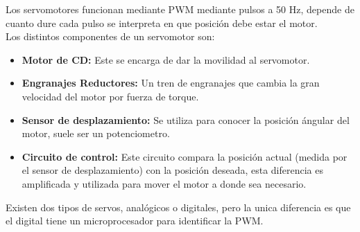 \documentclass[11pt]{scrartcl}
\begin{document}
Los servomotores funcionan mediante PWM mediante pulsos a 50 Hz, depende de cuanto dure cada pulso se interpreta en que posición debe estar el motor.  \\


Los distintos componentes de un servomotor son:

\begin{itemize}
    \item \textbf{Motor de CD: } Este se encarga de dar la movilidad al servomotor. 
    \item \textbf{Engranajes Reductores: } Un tren de engranajes que cambia la gran velocidad del motor por fuerza de torque. 
    \item \textbf{Sensor de desplazamiento: } Se utiliza para conocer la posición ángular del motor, suele ser un potenciometro.
    \item \textbf{Circuito de control: } Este circuito compara la posición actual (medida por el sensor de desplazamiento) con la posición deseada, esta diferencia es amplificada y utilizada para mover el motor a donde sea necesario.
\end{itemize}


Existen dos tipos de servos, analógicos o digitales, pero la unica diferencia es que el digital tiene un microprocesador para identificar la PWM.


    
\end{document}

